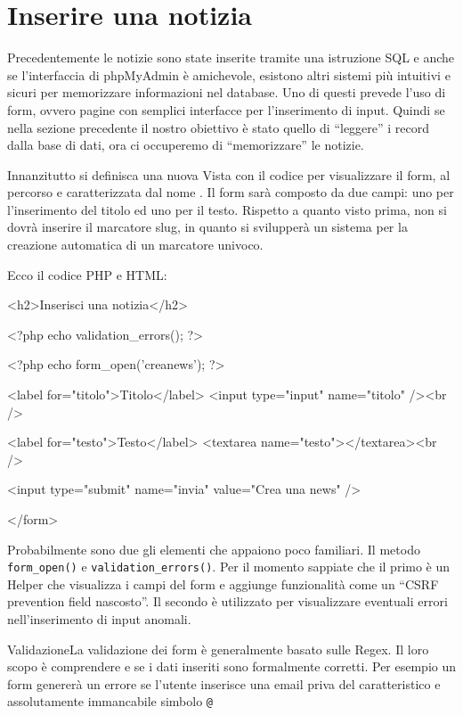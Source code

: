 \section*{Inserire una notizia}
Precedentemente le notizie sono state inserite tramite una istruzione SQL e anche se l'interfaccia di phpMyAdmin è amichevole, esistono altri sistemi più intuitivi e sicuri per memorizzare informazioni nel database. Uno di questi prevede l'uso di form, ovvero pagine con semplici interfacce per l'inserimento di input. Quindi se nella sezione precedente il nostro obiettivo è stato quello di ``leggere'' i record dalla base di dati, ora ci occuperemo di ``memorizzare'' le notizie.

Innanzitutto si definisca una nuova Vista con il codice per visualizzare il form, al percorso  e caratterizzata dal nome . Il form sarà composto da due campi: uno per l'inserimento del titolo ed uno per il testo. Rispetto a quanto visto prima, non si dovrà inserire il marcatore slug, in quanto si svilupperà un sistema per la creazione automatica di un marcatore univoco.

Ecco il codice \ac{PHP} e \ac{HTML}:

\begin{code}
<h2>Inserisci una notizia</h2>

<?php echo validation_errors(); ?>

<?php echo form_open('creanews'); ?>

	<label for="titolo">Titolo</label>
	<input type="input" name="titolo" /><br />

	<label for="testo">Testo</label>
	<textarea name="testo"></textarea><br />

	<input type="submit" name="invia" value="Crea una news" />

</form>
\end{code}

Probabilmente sono due gli elementi che appaiono poco familiari. Il metodo \verb|form_open()| e \verb|validation_errors()|. Per il momento sappiate che il primo è un Helper che visualizza i campi del form e aggiunge funzionalità come un ``CSRF prevention field nascosto''. Il secondo è utilizzato per visualizzare eventuali errori nell'inserimento di input anomali.

\begin{deftab}{Validazione}{La validazione dei form è generalmente basato sulle Regex. Il loro scopo è comprendere e se i dati inseriti sono formalmente corretti. Per esempio un form genererà un errore se l'utente inserisce una email priva del caratteristico e assolutamente immancabile simbolo \verb|@|}
\end{deftab}

